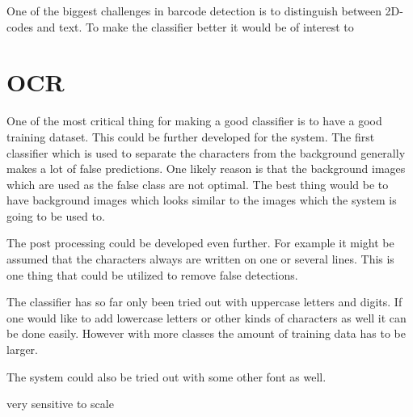 One of the biggest challenges in barcode detection is to distinguish between 2D-codes and text. To make the classifier better it would be of interest to 
\section{OCR}
\label{sec:OCR}
One of the most critical thing for making a good classifier is to have a good training dataset. This could be further developed for the system. The first classifier which is used to separate the characters from the background generally makes a lot of false predictions. One likely reason is that the background images which are used as the false class are not optimal. The best thing would be to have background images which looks similar to the images which the system is going to be used to.

The post processing could be developed even further. For example it might be assumed that the characters always are written on one or several lines. This is one thing that could be utilized to remove false detections. 

The classifier has so far only been tried out with uppercase letters and digits. If one would like to add lowercase letters or other kinds of characters as well it can be done easily. However with more classes the amount of training data has to be larger.

The system could also be tried out with some other font as well. 
 
very sensitive to scale